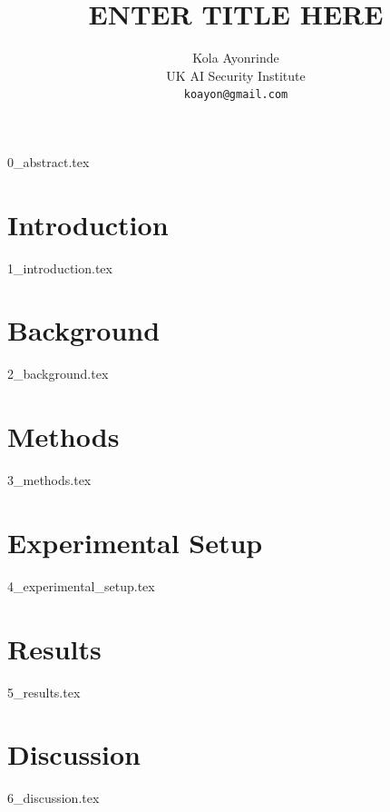 \documentclass{article} %
\title{ENTER TITLE HERE}
\author{{\hspace{1mm}Kola Ayonrinde} \\
  UK AI Security Institute \\
  \texttt{koayon@gmail.com} \\
}
\begin{document}
\maketitle





{0_abstract.tex}

\section{Introduction}
\label{sec:intro}
{1_introduction.tex}


\section{Background}
\label{sec:background}
{2_background.tex}

\section{Methods}
\label{sec:methods}
{3_methods.tex}



\section{Experimental Setup}
\label{setup}
{4_experimental_setup.tex}

\section{Results}
\label{sec:results}
{5_results.tex}


\section{Discussion}
\label{discussion}
{6_discussion.tex}
\end{document}
